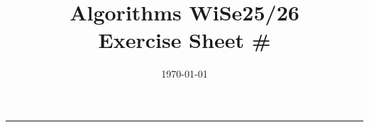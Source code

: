 \documentclass[11pt,a4paper]{article}
\title{
    \vspace{-2cm}
    \Large\textbf{Algorithms WiSe25/26}\\
    \large Exercise Sheet \#\exercisenum
    \vspace{-0.5cm}
}
\author{}  %
\date{\today}
\newcommand{\exercisenum}{X}
\begin{document}
\maketitle
\thispagestyle{fancy}
\noindent\rule{\textwidth}{0.4pt}

\linenumbers


\newcommand{\exercisetitle}[1]{%
    \newpage%
    \setcounter{page}{1}%
    \nolinenumbers%
    {\centering\Large\textbf{Algorithms WiSe25/26}\par}%
    {\centering\large Exercise Sheet \#\exercisenum\par}%
    \vspace{1em}%
    \section*{#1}%
    \resetlinenumber%
    \linenumbers%
}

\newcommand{\exercisepart}[1]{%
    \nolinenumbers%
    \subsection*{#1}%
    \linenumbers%
}


\end{document}

